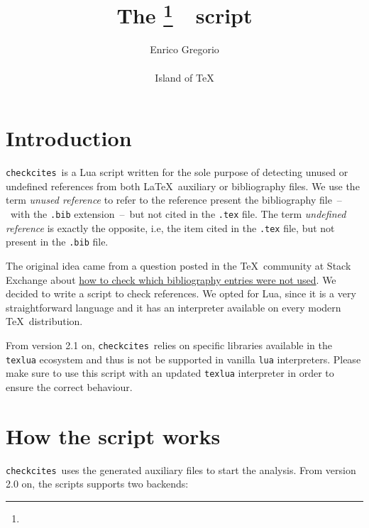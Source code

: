 \documentclass[12pt,a4paper]{article}
\title{The \checkcites\footnote{\version}\ \ script}
\author{%
  Enrico Gregorio\\\email{Enrico.Gregorio@univr.it}\\[3ex]
  Island of \TeX\\\email{https://gitlab.com/islandoftex}%
}
\date{}
\newcommand{\checkcites}{\texttt{checkcites}}
\newenvironment{infoblock}[1]
  {\par\addvspace{\medskipamount}
   \begin{tcolorbox}[colframe=DarkTurquoise,coltitle=black,fonttitle=\bfseries,title=#1]}
  {\end{tcolorbox}\addvspace{\medskipamount}}
\begin{document}
\maketitle

\tableofcontents

\section{Introduction}
\label{sec:intro}

\checkcites\  is  a  Lua  script  written for  the  sole  purpose  of
detecting unused or undefined  references from both \LaTeX\ auxiliary
or bibliography  files. We  use the  term \emph{unused  reference} to
refer  to the  reference  present the  bibliography file~--~with  the
\verb|.bib|  extension~--~but  not  cited in  the  \verb|.tex|  file.
The  term \emph{undefined  reference} is  exactly the  opposite, i.e,
the  item cited  in  the \verb|.tex|  file, but  not  present in  the
\verb|.bib| file.

The    original     idea    came     from    a     question    posted
in    the     \TeX\    community    at    Stack     Exchange    about
\href{http://tex.stackexchange.com/questions/43276}{how    to   check
which  bibliography entries  were not  used}. We  decided to  write a
script  to check  references. We  opted for  Lua, since it is a  very
straightforward language and it has an interpreter available on every
modern \TeX\ distribution.

\begin{infoblock}{Attention!}
From version 2.1 on, \checkcites\ relies on specific libraries available
in the \verb|texlua| ecosystem and thus is not be supported in vanilla
\verb|lua| interpreters. Please make sure to use this script with an
updated \verb|texlua| interpreter in order to ensure the correct behaviour.
\end{infoblock}

\section{How the script works}
\label{sec:howto}

\checkcites\  uses  the  generated   auxiliary  files  to  start  the
analysis. From version 2.0 on, the scripts supports two backends:
\end{document}
